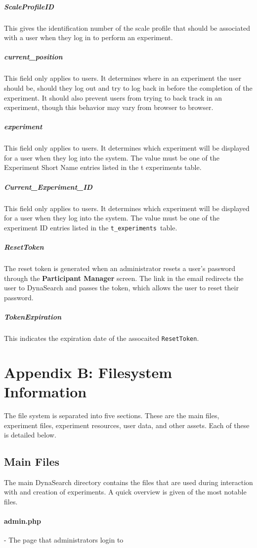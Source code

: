 \documentclass[article]{ij4uq}              %
\begin{document}
\subparagraph{ScaleProfileID}
This gives the identification number of the scale profile that should be associated with a user when they log in to perform an experiment.

\subparagraph{current\_position}
This field only applies to users. It determines where in an experiment the user should be, should they log out and try to log back in before the completion of the experiment. It should also prevent users from trying to back track in an experiment, though this behavior may vary from browser to browser. 

\subparagraph{experiment}
This field only applies to users. It determines which experiment will be displayed for a user when they log into the system. The value must be one of the Experiment Short Name entries listed in the t experiments table. 

\subparagraph{Current\_Experiment\_ID}
This field only applies to users. It determines which experiment will be displayed for a user when they log into the system. The value must be one of the experiment ID entries listed in the \texttt{t\_experiments }table. 

\subparagraph{ResetToken}
The reset token is generated when an administrator resets a user's password through the \textbf{Participant Manager} screen.  The link in the email redirects the user to DynaSearch and passes the token, which allows the user to reset their password.

\subparagraph{TokenExpiration}
This indicates the expiration date of the assocaited \texttt{ResetToken}.

\section{Appendix B: Filesystem Information}
The file system is separated into five sections. These are the main files, experiment files, experiment resources, user data, and other assets. Each of these is detailed below.

\subsection{Main Files}
The main DynaSearch directory contains the files that are used during interaction with and creation of experiments. A quick overview is given of the most notable files.

\paragraph{admin.php} - The page that administrators login to
\end{document}
